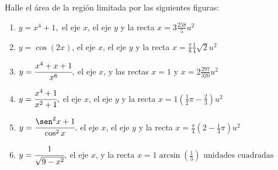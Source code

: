 \begin{ejer}{Halle el área de la región limitada por las siguientes figuras:}
\end{ejer}

{\small
\begin{enumerate}

\item {$y=x^{4}+1,$ el eje $x$, el eje $y$ y la recta $x=3$}{$\allowbreak \frac{258}{5}u^{2}$}


\item  {$y=\cos(2x)$, el eje $x$, el eje $y$ y la recta $x=\frac{\pi }{8}$}{$\allowbreak \frac{1}{4}\sqrt{2}u^{2}$}


\item  {$y=\cfrac{x^{4}+x+1}{x^{6}},$ el eje $x$, y las rectas $x=1$ y $x=2$}{$\allowbreak \frac{297}{320}u^{2}$}


\item  {$y=\cfrac{x^{4}+1}{x^{2}+1},$ el eje $x$, el eje $y$ y la recta $x=1$}{$\allowbreak \left( \frac{1}{2}\pi -%
\frac{2}{3}\right) u^{2}$}


\item {$ y=\cfrac{\sen^{2}x+1}{\cos ^{2}x},$ el eje $x$, el eje $y$ y la recta $x=\frac{\pi }{4}$}{$\left(
\allowbreak 2-\frac{1}{4}\pi \right) u^{2}$}


\item  {$y=\cfrac{1}{\sqrt{9-x^{2}}},$ el eje $x$, y la recta $x=1$}{$\arcsin \left( \frac{1}{3}\right) \text{ unidades cuadradas}$}

\end{enumerate}
}